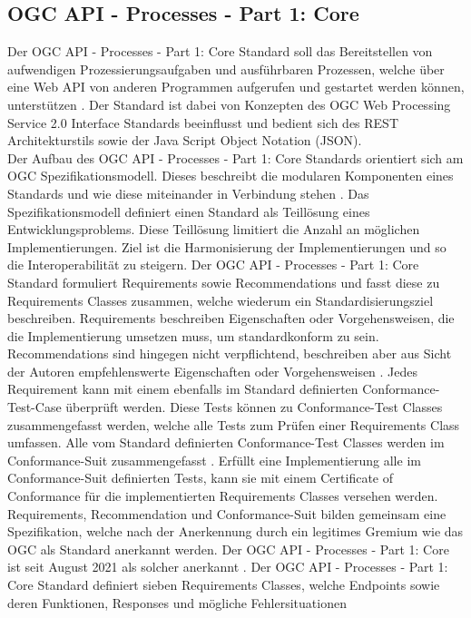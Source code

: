 \subsection{OGC API - Processes - Part 1: Core}
Der OGC API - Processes - Part 1: Core Standard soll das Bereitstellen von aufwendigen Prozessierungsaufgaben und ausführbaren Prozessen, welche über eine Web API
von anderen Programmen aufgerufen und gestartet werden können, unterstützen \cite{ogc_api_processes_core}. Der Standard ist dabei von Konzepten des 
OGC Web Processing Service 2.0 Interface Standards beeinflusst und bedient sich des REST Architekturstils sowie der Java Script Object Notation (JSON).\\
Der Aufbau des OGC API - Processes - Part 1: Core Standards orientiert sich am OGC Spezifikationsmodell. Dieses beschreibt die modularen Komponenten eines Standards und 
wie diese miteinander in Verbindung stehen \cite{ogc_specification_model}. 
Das Spezifikationsmodell definiert einen Standard als Teillösung eines Entwicklungsproblems.
Diese Teillösung limitiert die Anzahl an möglichen Implementierungen. Ziel ist die Harmonisierung der Implementierungen und so die Interoperabilität zu steigern.
Der OGC API - Processes - Part 1: Core Standard formuliert Requirements sowie Recommendations und fasst diese zu Requirements Classes zusammen, welche wiederum 
ein Standardisierungsziel beschreiben. Requirements beschreiben Eigenschaften oder Vorgehensweisen, die die Implementierung umsetzen muss, um standardkonform zu sein. 
Recommendations sind hingegen nicht verpflichtend, beschreiben aber aus Sicht der Autoren empfehlenswerte Eigenschaften oder Vorgehensweisen \cite{ogc_specification_model}. 
Jedes Requirement kann mit einem ebenfalls im Standard definierten Conformance-Test-Case überprüft werden. Diese Tests können zu Conformance-Test Classes zusammengefasst werden,
welche alle Tests zum Prüfen einer Requirements Class umfassen. Alle vom 
Standard definierten Conformance-Test Classes werden im Conformance-Suit zusammengefasst \cite{ogc_specification_model}. 
Erfüllt eine Implementierung alle im Conformance-Suit definierten Tests, kann sie mit einem Certificate of Conformance für die implementierten Requirements Classes 
versehen werden. Requirements, Recommendation und Conformance-Suit bilden gemeinsam eine Spezifikation, welche nach der Anerkennung durch ein legitimes 
Gremium wie das OGC als Standard anerkannt werden. Der OGC API - Processes - Part 1: Core ist seit August 2021 als solcher anerkannt \cite{ogc_specification_model,ogc_api_processes_core}. 
Der OGC API - Processes - Part 1: Core Standard definiert sieben Requirements Classes, welche Endpoints sowie deren Funktionen, Responses und mögliche Fehlersituationen
